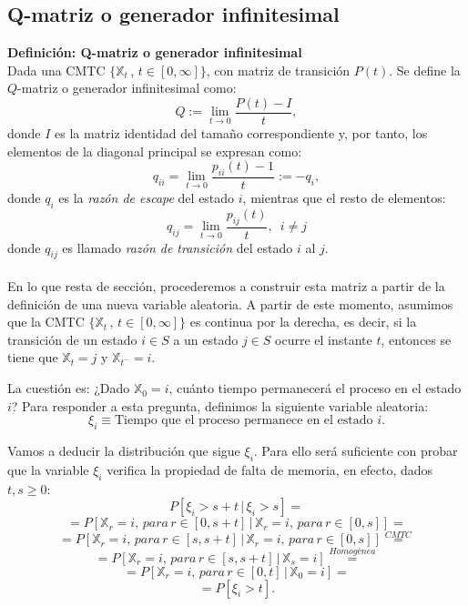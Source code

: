 \documentclass[12pt,a4paper]{article}
\begin{document}
\subsection{Q-matriz o generador infinitesimal}


\textbf{Definición: Q-matriz o generador infinitesimal}
\\
Dada una CMTC $\{\mathbb{X}_t \, , \, t\in [0,\infty]\}$, con matriz de transición $P(t)$. Se define la $Q$-matriz o generador infinitesimal como:
$$Q:=\lim_{t \to 0}\dfrac{P(t)-I}{t},$$
donde $I$ es la matriz identidad del tamaño correspondiente y, por tanto, los elementos de la diagonal principal se expresan como:
$$q_{ii}=\lim_{t \to 0}\dfrac{p_{ii}(t)-1}{t}:=-q_i,$$
donde $q_i$ es la \textit{razón de escape} del estado $i$, mientras que el resto de elementos:
$$q_{ij}=\lim_{t \to 0}\dfrac{p_{ij}(t)}{t},\,\,\, i\neq j$$
donde $q_{ij}$ es llamado \textit{razón de transición} del estado $i$ al $j$.
\\\\
En lo que resta de sección, procederemos a construir esta matriz a partir de la definición de una nueva variable aleatoria. A partir de este momento, asumimos que la CMTC $\{\mathbb{X}_t \, , \, t\in [0,\infty]\}$ es continua por la derecha, es decir, si la transición de un estado $i\in S$ a un estado $j\in S$ ocurre el instante $t$, entonces se tiene que $\mathbb{X}_t=j$ y $\mathbb{X}_{t^-}=i$.

La cuestión es: ¿Dado $\mathbb{X}_0=i$, cuánto tiempo permanecerá el proceso en el estado $i$? Para responder a esta pregunta, definimos la siguiente variable aleatoria:
$$\xi_i\equiv \text{Tiempo que el proceso permanece en el estado} \,\, i.$$

Vamos a deducir la distribución que sigue $\xi_i$. Para ello será suficiente con probar que la variable $\xi_i$ verifica la propiedad de falta de memoria, en efecto, dados $t,s\geq 0$:
\\
$$P[\xi_i>s+t\, | \,\xi_i>s]=$$ 
$$=P[\mathbb{X}_r=i,\, para \, r\in[0,s+t]\, | \,\mathbb{X}_r=i,\, para \, r\in[0,s]]=$$
$$=P[\mathbb{X}_r=i,\, para \, r\in[s,s+t]\, | \,\mathbb{X}_r=i,\, para \, r\in[0,s]]\overset{CMTC}{=}$$
$$=P[\mathbb{X}_r=i,\, para \, r\in[s,s+t]\, | \,\mathbb{X}_s=i]\overset{\textit{Homogénea}}{=}$$
$$=P[\mathbb{X}_r=i,\, para \, r\in[0,t]\, | \,\mathbb{X}_0=i]=$$
$$=P[\xi_i>t].$$
\end{document}
